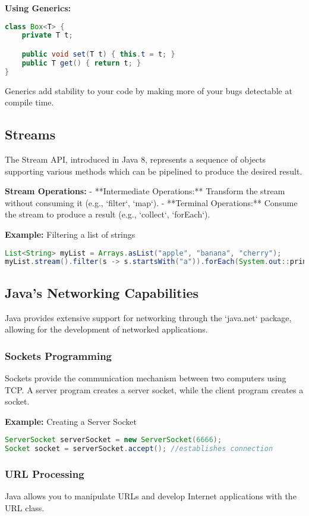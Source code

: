 \documentclass{article}
\begin{document}
\textbf{Using Generics:}
\begin{lstlisting}[language=Java]
class Box<T> {
    private T t;

    public void set(T t) { this.t = t; }
    public T get() { return t; }
}
\end{lstlisting}

Generics add stability to your code by making more of your bugs detectable at compile time.

\subsection{Streams}
The Stream API, introduced in Java 8, represents a sequence of objects supporting various methods which can be pipelined to produce the desired result.

\textbf{Stream Operations:}
- **Intermediate Operations:** Transform the stream without consuming it (e.g., `filter`, `map`).
- **Terminal Operations:** Consume the stream to produce a result (e.g., `collect`, `forEach`).

\textbf{Example:} Filtering a list of strings
\begin{lstlisting}[language=Java]
List<String> myList = Arrays.asList("apple", "banana", "cherry");
myList.stream().filter(s -> s.startsWith("a")).forEach(System.out::println);
\end{lstlisting}

\subsection{Java's Networking Capabilities}
Java provides extensive support for networking through the `java.net` package, allowing for the development of networked applications.

\subsubsection{Sockets Programming}
Sockets provide the communication mechanism between two computers using TCP. A server program creates a server socket, while the client program creates a socket.

\textbf{Example:} Creating a Server Socket
\begin{lstlisting}[language=Java]
ServerSocket serverSocket = new ServerSocket(6666);
Socket socket = serverSocket.accept(); //establishes connection
\end{lstlisting}

\newpage
\subsubsection{URL Processing}
Java allows you to manipulate URLs and develop Internet applications with the URL class.
\end{document}
